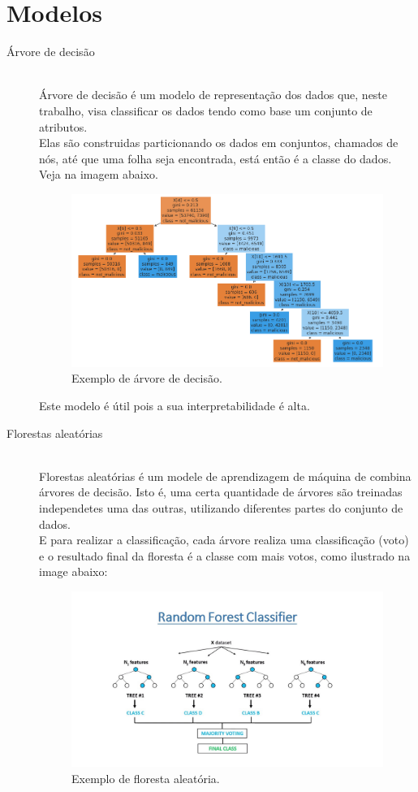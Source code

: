 \section{Modelos}


\begin{description}
    \item[Árvore de decisão] \hfill \\ Árvore de decisão é um modelo de representação dos dados que, neste trabalho, visa classificar os dados tendo como base um conjunto de atributos. \\ 
    Elas são construidas particionando os dados em conjuntos, chamados de nós, até que uma folha seja encontrada, está então é a classe do dados. Veja na imagem abaixo.
    
    \begin{figure}
        \centering
        \includegraphics[width=.6\textwidth]{figuras/ex_decicion_tree.png}
        \caption{Exemplo de árvore de decisão.\label{fig:ex_decision_tree}}    
    \end{figure}

    Este modelo é útil pois a sua interpretabilidade é alta.

    \item[Florestas aleatórias] \hfill \\ Florestas aleatórias é um modele de aprendizagem de máquina de combina árvores de decisão. Isto é, uma certa quantidade de árvores são treinadas independetes uma das outras, utilizando diferentes partes do conjunto de dados. \\ 
    E para realizar a classificação, cada árvore realiza uma classificação (voto) e o resultado final da floresta é a classe com mais votos, como ilustrado na image abaixo:\\

    \begin{figure}
        \centering
        \includegraphics[width=.8\textwidth]{figuras/ex_random_forest.jpg}
        \caption{Exemplo de floresta aleatória.\label{fig:ex_random_forest}}    
    \end{figure}


\end{description}
